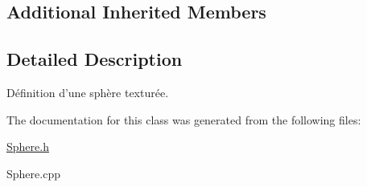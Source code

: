 \subsection*{Additional Inherited Members}


\subsection{Detailed Description}
Définition d'une sphère texturée. 

The documentation for this class was generated from the following files\-:\begin{DoxyCompactItemize}
\item 
\hyperlink{Sphere_8h}{Sphere.\-h}\item 
Sphere.\-cpp\end{DoxyCompactItemize}
